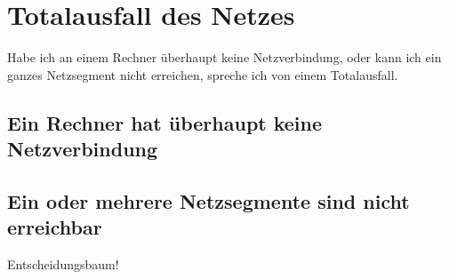 \chapter{Totalausfall des Netzes}
\label{cha:netz-totalausfall}

\begin{abstractsec}
  Habe ich an einem Rechner überhaupt keine Netzverbindung, oder kann ich ein
  ganzes Netzsegment nicht erreichen, spreche ich von einem Totalausfall.
\end{abstractsec}

\section{Ein Rechner hat überhaupt keine Netzverbindung}
\label{sec:gar-kein-netz}





\section{Ein oder mehrere Netzsegmente sind nicht erreichbar}
\label{sec:ausfall-netzsegment}

\begin{notes}
\item Entscheidungsbaum!
\end{notes}

